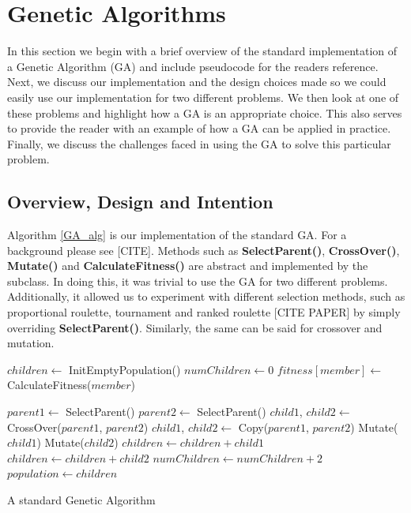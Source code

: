 \section{Genetic Algorithms}
In this section we begin with a brief overview of the standard implementation of a Genetic Algorithm (GA) and include
pseudocode for the readers reference. Next, we discuss our implementation and the design choices made so we could easily
use our implementation for two different problems. We then look at one of these problems and highlight how a GA is an
appropriate choice. This also serves to provide the reader with an example of how a GA can be applied in practice.
Finally, we discuss the challenges faced in using the GA to solve this particular problem.


\subsection{Overview, Design and Intention}
Algorithm \ref{GA_alg} is our implementation of the standard GA. For a background please see [CITE]. Methods such as \textbf{SelectParent()}, \textbf{CrossOver()}, \textbf{Mutate()} and \textbf{CalculateFitness()} are abstract and implemented by the subclass.
In doing this, it was trivial to use the GA for two different problems. Additionally, it allowed us to experiment with 
different selection methods, such as proportional roulette, tournament and ranked roulette [CITE PAPER] by simply 
overriding \textbf{SelectParent()}. Similarly, the same can be said for crossover and mutation.
\begin{algorithm}[h]
\begin{algorithmic}
\State $children \gets$ InitEmptyPopulation()
\State $numChildren \gets 0$ 
	\State $fitness[member] \gets$ CalculateFitness($member$)
\EndFor

	\State $parent1 \gets$ SelectParent()
	\State $parent2 \gets$ SelectParent()
		\State $child1$, $child2 \gets $ CrossOver($parent1$, $parent2$)
	\Else
		\State $child1$, $child2 \gets $ Copy($parent1$, $parent2$)
	\EndIf
	\State Mutate($child1$) 
	\State Mutate($child2$) 
	\State $children \gets children + child1$
	\State $children \gets children + child2$
	\State $numChildren \gets numChildren + 2$
\EndWhile
\State $population \gets children$ 
\caption{A standard Genetic Algorithm}
\label{GA_alg}
\end{algorithmic}
\end{algorithm}

